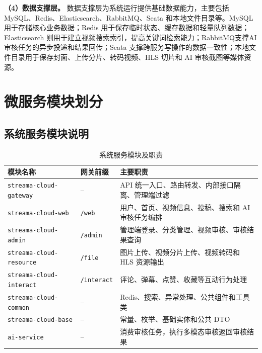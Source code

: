 \noindent\textbf{（4）数据支撑层。}
数据支撑层为系统运行提供基础数据能力，主要包括 MySQL、Redis、Elasticsearch、RabbitMQ、Seata 和本地文件目录等。MySQL 用于存储核心业务数据；Redis 用于保存临时状态、缓存数据和轻量队列数据；Elasticsearch 则用于建立视频搜索索引，提高关键词检索能力；RabbitMQ支撑AI审核任务的异步投递和结果回传；Seata 支撑跨服务写操作的数据一致性；本地文件目录用于保存封面、上传分片、转码视频、HLS 切片和 AI 审核截图等媒体资源。

\section{微服务模块划分}
\label{sec:microservice-module-design}

\subsection{系统服务模块说明}
\label{subsec:service-module-description}

\begin{table}[htbp]
    \centering
    \caption{系统服务模块及职责}
    \label{tab:service-modules}
    \begin{tabular}{p{}p{}p{}}
    \hline
    \textbf{模块名称} & \textbf{网关前缀} & \textbf{主要职责} \\
    \hline
    \texttt{streama-cloud-gateway} & -- & API 统一入口、路由转发、内部接口隔离、管理端过滤 \\
    \texttt{streama-cloud-web} & \texttt{/web} & 用户、首页、视频信息、投稿、搜索和 AI 审核任务编排 \\
    \texttt{streama-cloud-admin} & \texttt{/admin} & 管理端登录、分类管理、视频审核、审核结果查询 \\
    \texttt{streama-cloud-resource} & \texttt{/file} & 图片上传、视频分片上传、视频转码和 HLS 资源输出 \\
    \texttt{streama-cloud-interact} & \texttt{/interact} & 评论、弹幕、点赞、收藏等互动行为处理 \\
    \texttt{streama-cloud-common} & -- & Redis、搜索、异常处理、公共组件和工具类 \\
    \texttt{streama-cloud-base} & -- & 常量、枚举、基础实体和公共 DTO \\
    \texttt{ai-service} & -- & 消费审核任务，执行多模态审核返回审核结果 \\
    \hline
    \end{tabular}
\end{table}

